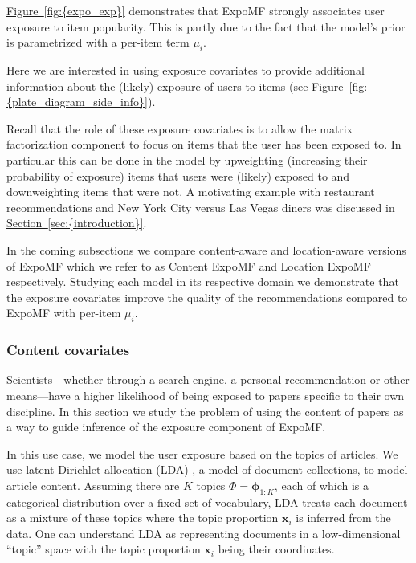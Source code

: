 \documentclass{sig-alternate-arxiv}
\begin{document}
{\hyperref[fig:{expo_exp}]{Figure~\ref*{fig:{expo_exp}}}} demonstrates that ExpoMF strongly associates user
exposure to item popularity. This is partly due to the fact that the
model's prior is parametrized with a per-item term $\mu_i$. 

Here we are interested in using exposure covariates to provide additional
information about the (likely) exposure of users to items (see
{\hyperref[fig:{plate_diagram_side_info}]{Figure~\ref*{fig:{plate_diagram_side_info}}}}). 

Recall that the role of these exposure covariates
is to allow the matrix factorization component to focus
 on items that the user has been exposed to. In particular this can be done
in the model by upweighting (increasing their probability of exposure)
items that users were (likely) exposed to and downweighting items that
were not. A motivating example with restaurant recommendations and New York
City versus Las Vegas diners was discussed in {\hyperref[sec:{introduction}]{Section~\ref*{sec:{introduction}}}}.

In the coming subsections we compare content-aware and location-aware
versions of ExpoMF which we refer to as Content ExpoMF and Location ExpoMF
respectively. Studying each model in its respective domain we demonstrate
that the exposure covariates improve the quality of the recommendations
compared to ExpoMF with per-item $\mu_i$.

\subsubsection{Content covariates}\label{sec:si_doc}

Scientists---whether through a search engine, a personal recommendation
or other means---have a higher likelihood of being exposed to papers
specific to their own discipline. In this section we study the problem of
using the content of papers as a way to guide inference of the exposure
component of ExpoMF.

In this use case, we model the user exposure based on the topics of
articles. We use latent Dirichlet allocation (LDA) \cite{blei2003latent},
a model of document collections, to model article content. 
Assuming there are $K$ topics $\Phi = \boldsymbol\phi_{1:K}$, each of which is a categorical distribution over a fixed set of vocabulary, LDA treats each document as a mixture of these topics where the topic proportion $\mathbf{x}_i$ is inferred from the data. One can understand LDA as representing documents in a low-dimensional ``topic'' space with the topic proportion $\mathbf{x}_i$ being their coordinates.  
\end{document}
